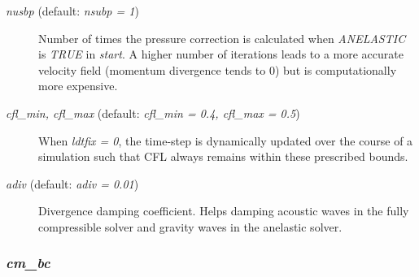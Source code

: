 \documentclass[12pt,A4,french]{article}
\begin{document}
\begin{description}
\item[{\it nusbp} (default: {\it nsubp = 1})]

Number of times the pressure correction is calculated when {\it ANELASTIC} is {\it TRUE} in {\it start}. A higher number of iterations leads to a more accurate velocity field (momentum divergence tends to 0) but is computationally more expensive.

\item[{\it cfl\_min, cfl\_max} (default: {\it cfl\_min = 0.4, cfl\_max = 0.5})]

When {\it ldtfix = 0}, the time-step is dynamically updated over the course of a simulation such that CFL always remains within these prescribed bounds.

\item[{\it adiv} (default: {\it adiv = 0.01})]

Divergence damping coefficient. Helps damping acoustic waves in the fully compressible solver and gravity waves in the anelastic solver.

\end{description}

\subsubsection{{\it cm\_bc}}
\end{document}
